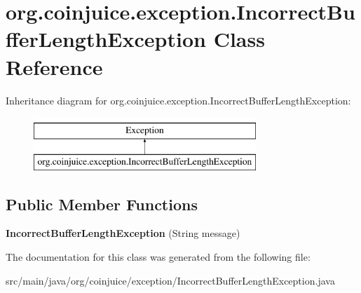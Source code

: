 \hypertarget{classorg_1_1coinjuice_1_1exception_1_1_incorrect_buffer_length_exception}{\section{org.\-coinjuice.\-exception.\-Incorrect\-Buffer\-Length\-Exception Class Reference}
\label{classorg_1_1coinjuice_1_1exception_1_1_incorrect_buffer_length_exception}
}
Inheritance diagram for org.\-coinjuice.\-exception.\-Incorrect\-Buffer\-Length\-Exception\-:\begin{figure}[H]
\begin{center}
\leavevmode
\includegraphics[height=2.000000cm]{classorg_1_1coinjuice_1_1exception_1_1_incorrect_buffer_length_exception}
\end{center}
\end{figure}
\subsection*{Public Member Functions}
\begin{DoxyCompactItemize}
\item 
\hypertarget{classorg_1_1coinjuice_1_1exception_1_1_incorrect_buffer_length_exception_a28d46616825dfff36f2d9a1233d994bf}{{\bfseries Incorrect\-Buffer\-Length\-Exception} (String message)}\label{classorg_1_1coinjuice_1_1exception_1_1_incorrect_buffer_length_exception_a28d46616825dfff36f2d9a1233d994bf}

\end{DoxyCompactItemize}


The documentation for this class was generated from the following file\-:\begin{DoxyCompactItemize}
\item 
src/main/java/org/coinjuice/exception/Incorrect\-Buffer\-Length\-Exception.\-java\end{DoxyCompactItemize}
